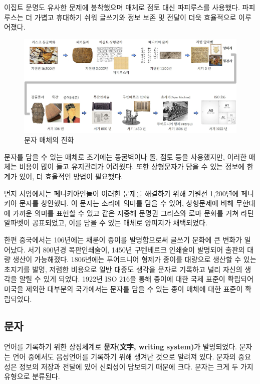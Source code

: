 \documentclass[
  letterpaper,
]{book}
\begin{document}
이집트 문명도 유사한 문제에 봉착했으며 매체로 점토 대신 파피루스를
사용했다. 파피루스는 더 가볍고 휴대하기 쉬워 글쓰기와 정보 보존 및
전달이 더욱 효율적으로 이루어졌다.

\begin{figure}

{\centering \includegraphics{images/writing-history.jpg}

}

\caption{문자 매체의 진화}

\end{figure}

문자를 담을 수 있는 매체로 초기에는 동굴벽이나 돌, 점토 등을 사용했지만,
이러한 매체는 비용이 많이 들고 유지관리가 어려웠다. 또한 상형문자가 담을
수 있는 정보에 한계가 있어, 더 효율적인 방법이 필요했다.

먼저 서양에서는 페니키아인들이 이러한 문제를 해결하기 위해 기원전
1,200년에 페니키아 문자를 창안했다. 이 문자는 소리에 의미를 담을 수
있어, 상형문제에 비해 무한대에 가까운 의미를 표현할 수 있고 같은 지중해
문명권 그리스와 로마 문화를 거쳐 라틴 알파벳이 공표되었고, 이를 담을 수
있는 매체로 양피지가 채택되었다.

한편 중국에서는 106년에는 채륜이 종이를 발명함으로써 글쓰기 문화에 큰
변화가 일어났다. 서기 800년경 목판인쇄술이, 1450년 구텐베르크 인쇄술이
발명되어 출판의 대량 생산이 가능해졌다. 1806년에는 푸어드니어 형제가
종이를 대량으로 생산할 수 있는 초지기를 발명, 저렴한 비용으로 일반
대중도 생각을 문자로 기록하고 널리 자신의 생각을 알릴 수 있게 되었다.
1922년 ISO 216을 통해 종이에 대한 국제 표준이 확립되어 미국을 제외한
대부분의 국가에서는 문자를 담을 수 있는 종이 매체에 대한 표준이
확립되었다.

\hypertarget{uxbb38uxc790}{%
\subsection{문자}\label{uxbb38uxc790}}

언어를 기록하기 위한 상징체계로 \textbf{문자(文字, writing system)}가
발명되었다. 문자는 언어 중에서도 음성언어를 기록하기 위해 생겨난 것으로
알려져 있다. 문자의 중요성은 정보의 저장과 전달에 있어 신뢰성이 담보되기
때문에 크다. 문자는 크게 두 가지 유형으로 분류된다.
\end{document}
